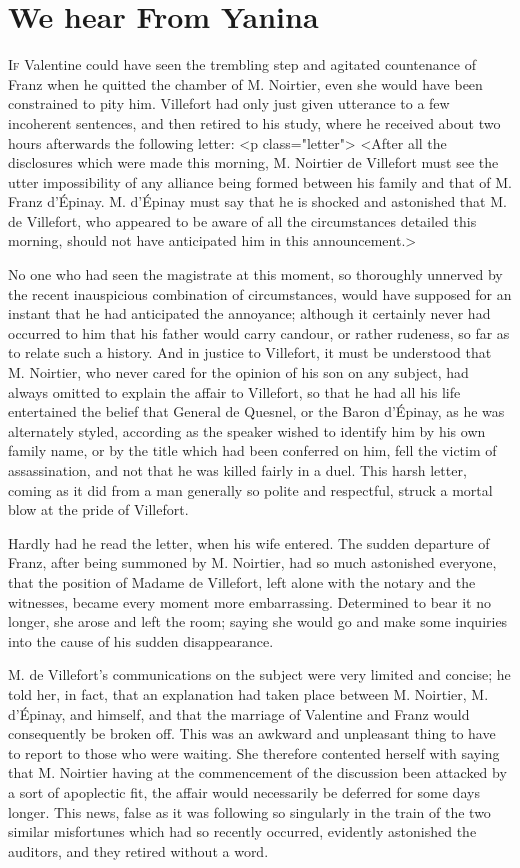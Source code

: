 \chapter{We hear From Yanina} 

 \lettrine{I}{f} Valentine could have seen the trembling step and agitated countenance of Franz when he quitted the chamber of M. Noirtier, even she would have been constrained to pity him. Villefort had only just given utterance to a few incoherent sentences, and then retired to his study, where he received about two hours afterwards the following letter:  <p class="letter"> <After all the disclosures which were made this morning, M. Noirtier de Villefort must see the utter impossibility of any alliance being formed between his family and that of M. Franz d'Épinay. M. d'Épinay must say that he is shocked and astonished that M. de Villefort, who appeared to be aware of all the circumstances detailed this morning, should not have anticipated him in this announcement.> 

 No one who had seen the magistrate at this moment, so thoroughly unnerved by the recent inauspicious combination of circumstances, would have supposed for an instant that he had anticipated the annoyance; although it certainly never had occurred to him that his father would carry candour, or rather rudeness, so far as to relate such a history. And in justice to Villefort, it must be understood that M. Noirtier, who never cared for the opinion of his son on any subject, had always omitted to explain the affair to Villefort, so that he had all his life entertained the belief that General de Quesnel, or the Baron d'Épinay, as he was alternately styled, according as the speaker wished to identify him by his own family name, or by the title which had been conferred on him, fell the victim of assassination, and not that he was killed fairly in a duel. This harsh letter, coming as it did from a man generally so polite and respectful, struck a mortal blow at the pride of Villefort. 

 Hardly had he read the letter, when his wife entered. The sudden departure of Franz, after being summoned by M. Noirtier, had so much astonished everyone, that the position of Madame de Villefort, left alone with the notary and the witnesses, became every moment more embarrassing. Determined to bear it no longer, she arose and left the room; saying she would go and make some inquiries into the cause of his sudden disappearance. 

 M. de Villefort's communications on the subject were very limited and concise; he told her, in fact, that an explanation had taken place between M. Noirtier, M. d'Épinay, and himself, and that the marriage of Valentine and Franz would consequently be broken off. This was an awkward and unpleasant thing to have to report to those who were waiting. She therefore contented herself with saying that M. Noirtier having at the commencement of the discussion been attacked by a sort of apoplectic fit, the affair would necessarily be deferred for some days longer. This news, false as it was following so singularly in the train of the two similar misfortunes which had so recently occurred, evidently astonished the auditors, and they retired without a word. 


